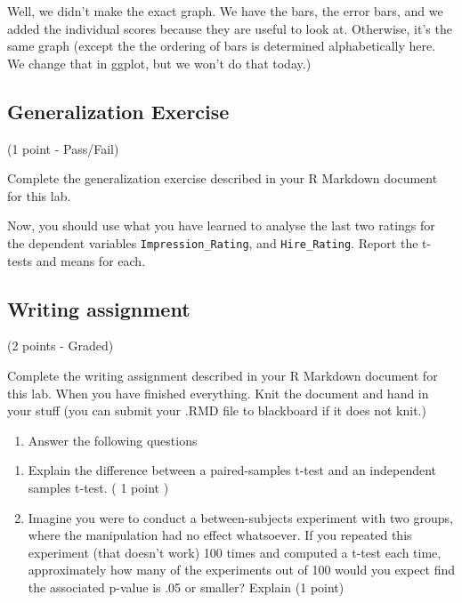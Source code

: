 \documentclass[]{book}
\providecommand{\tightlist}{%
  \setlength{\itemsep}{0pt}\setlength{\parskip}{0pt}}
\begin{document}
Well, we didn't make the exact graph. We have the bars, the error bars,
and we added the individual scores because they are useful to look at.
Otherwise, it's the same graph (except the the ordering of bars is
determined alphabetically here. We change that in ggplot, but we won't
do that today.)

\subsection{Generalization Exercise}\label{generalization-exercise-6}

(1 point - Pass/Fail)

Complete the generalization exercise described in your R Markdown
document for this lab.

Now, you should use what you have learned to analyse the last two
ratings for the dependent variables \texttt{Impression\_Rating}, and
\texttt{Hire\_Rating}. Report the t-tests and means for each.

\subsection{Writing assignment}\label{writing-assignment-6}

(2 points - Graded)

Complete the writing assignment described in your R Markdown document
for this lab. When you have finished everything. Knit the document and
hand in your stuff (you can submit your .RMD file to blackboard if it
does not knit.)

\begin{enumerate}
\def\labelenumi{\arabic{enumi}.}
\tightlist
\item
  Answer the following questions
\end{enumerate}

\begin{enumerate}
\def\labelenumi{\alph{enumi}.}
\item
  Explain the difference between a paired-samples t-test and an
  independent samples t-test. ( 1 point )
\item
  Imagine you were to conduct a between-subjects experiment with two
  groups, where the manipulation had no effect whatsoever. If you
  repeated this experiment (that doesn't work) 100 times and computed a
  t-test each time, approximately how many of the experiments out of 100
  would you expect find the associated p-value is .05 or smaller?
  Explain (1 point)
\end{enumerate}
\end{document}
